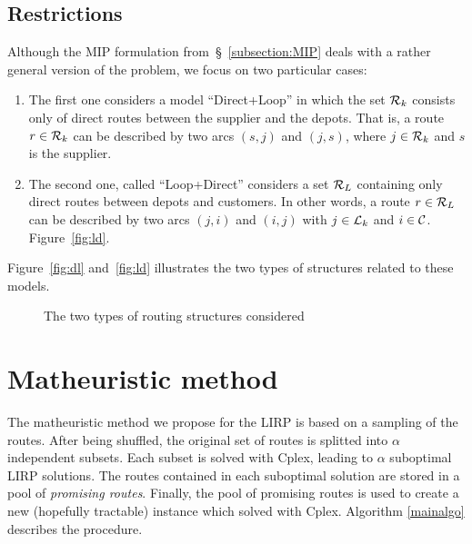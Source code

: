 \documentclass[10pt, a4paper]{article}
\begin{document}
\subsection{Restrictions}
Although the MIP formulation from~\S~\ref{subsection:MIP} deals with a rather general version of the problem, we focus on two particular cases:
\begin{enumerate}
    \item The first one considers a model ``Direct+Loop'' in which the set $\mathcal{R}_k$ consists only of direct routes between the supplier and the depots. 
        That is, a route $r\in\mathcal{R}_k$ can be described by two arcs $(s,j)$ and $(j,s)$, where $j\in\mathcal{R}_k$ and $s$ is the supplier.
    \item The second one, called ``Loop+Direct'' considers a set $\mathcal{R}_L$ containing only direct routes between depots and customers. 
        In other words, a route $r\in\mathcal{R}_L$ can be described by two arcs $(j,i)$ and $(i,j)$ with $j\in\mathcal{L}_k$ and $i\in\mathcal{C}$. Figure~\ref{fig:ld}.
\end{enumerate}
Figure~\ref{fig:dl} and~\ref{fig:ld} illustrates the two types of structures related to these models.
\begin{figure}
    \centering
    \caption{The two types of routing structures considered}
\end{figure}


\section{Matheuristic method} 

The matheuristic method we propose for the LIRP is based on a sampling of the routes. 
After being shuffled, the original set of routes is splitted into $\alpha$ independent subsets. 
Each subset is solved with Cplex, leading to $\alpha$ suboptimal LIRP solutions.  
The routes contained in each suboptimal solution are stored in a pool of \textit{promising routes}. 
Finally, the pool of promising routes is used to create a new (hopefully tractable) instance which solved with Cplex. 
Algorithm \ref{mainalgo} describes the procedure.
\end{document}
